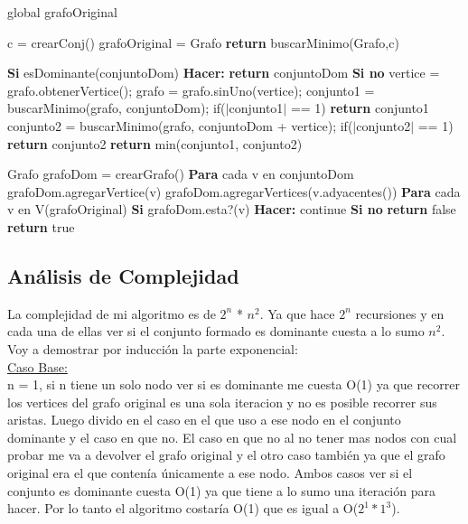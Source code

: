 global grafoOriginal

\begin{codebox}
\li	c = crearConj()
\li	grafoOriginal = Grafo
\li	\textbf{return} buscarMinimo(Grafo,c)
\end{codebox}

\begin{codebox}
\li\textbf{Si} esDominante(conjuntoDom) \textbf{Hacer:} \Do
\li		\textbf{return} conjuntoDom 
\End
\li	\textbf{Si no}  \Do
\li		vertice = grafo.obtenerVertice(); 
\li		grafo = grafo.sinUno(vertice);
\li		conjunto1 = buscarMinimo(grafo, conjuntoDom);
\li		if($|$conjunto1$|$ == 1) \textbf{return} conjunto1
\li		conjunto2 = buscarMinimo(grafo, conjuntoDom + vertice);
\li		if($|$conjunto2$|$ == 1) \textbf{return} conjunto2
\li		\textbf{return} min(conjunto1, conjunto2)	
\End

\end{codebox}

\begin{codebox}
\li Grafo grafoDom = crearGrafo()
\li \textbf{Para} cada v en conjuntoDom \Do
\li	grafoDom.agregarVertice(v)
\li     grafoDom.agregarVertices(v.adyacentes())
\End
\li \textbf{Para} cada v en V(grafoOriginal) \Do
\li \textbf{Si} grafoDom.esta?(v) \textbf{Hacer:} \Do
\li			continue 
\End		
\li \textbf{Si no}  \Do
\li							
\li		\textbf{return} false
    \End		
	\End
\li	\textbf{return} true

\end{codebox}

\subsection{Análisis de Complejidad}

La complejidad de mi algoritmo es de $2^n$ * $n^2$. Ya que hace $2^n$ recursiones y en cada una de ellas ver si el conjunto formado es dominante cuesta a lo sumo $n^2$. Voy a demostrar por inducción la parte exponencial:\\

\underline{Caso Base:}\\

n = 1, si n tiene un solo nodo ver si es dominante me cuesta O(1) ya que recorrer los vertices del grafo original es una sola iteracion y no es posible recorrer sus aristas. Luego divido en el caso en el que uso a ese nodo en el conjunto dominante y el caso en que no. El caso en que no al no tener mas nodos con cual probar me va a devolver el grafo original y el otro caso también ya que el grafo original era el que contenía únicamente a ese nodo. Ambos casos ver si el conjunto es dominante cuesta O(1) ya que tiene a lo sumo una iteración para hacer. Por lo tanto el algoritmo costaría O(1) que es igual a O($2^1*1^3$).\\

